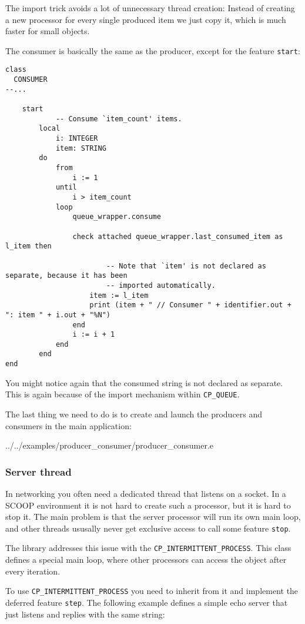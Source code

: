 \documentclass[a4paper,10pt]{report}
\begin{document}
The import trick avoids a lot of unnecessary thread creation:
Instead of creating a new processor for every single produced item we just copy it, which is much faster for small objects.

The consumer is basically the same as the producer, except for the feature \lstinline!start!:

\begin{lstlisting}
class
  CONSUMER
--...
  
	start
			-- Consume `item_count' items.
		local
			i: INTEGER
			item: STRING
		do
			from
				i := 1
			until
				i > item_count
			loop
				queue_wrapper.consume

				check attached queue_wrapper.last_consumed_item as l_item then

						-- Note that `item' is not declared as separate, because it has been
						-- imported automatically.
					item := l_item
					print (item + " // Consumer " + identifier.out + ": item " + i.out + "%N")
				end
				i := i + 1
			end
		end
end
\end{lstlisting}

You might notice again that the consumed string is not declared as separate.
This is again because of the import mechanism within \lstinline!CP_QUEUE!.

The last thing we need to do is to create and launch the producers and consumers in the main application:

 {../../examples/producer_consumer/producer_consumer.e}


\subsubsection{Server thread}

In networking you often need a dedicated thread that listens on a socket.
In a SCOOP environment it is not hard to create such a processor, but it is hard to stop it.
The main problem is that the server processor will run its own main loop, and other threads ususally never get exclusive access to call some feature \lstinline!stop!.

The library addresses this issue with the \lstinline!CP_INTERMITTENT_PROCESS!.
This class defines a special main loop, where other processors can access the object after every iteration.

To use \lstinline!CP_INTERMITTENT_PROCESS! you need to inherit from it and implement the deferred feature \lstinline!step!.
The following example defines a simple echo server that just listens and replies with the same string:
\end{document}
